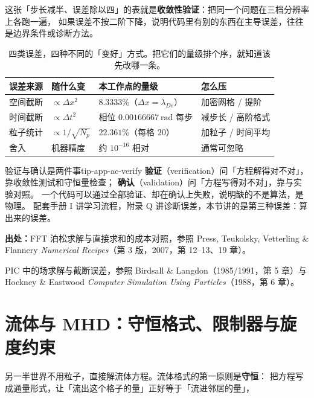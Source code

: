 这张「步长减半、误差除以四」的表就是\textbf{收敛性验证}：把同一个问题在三档分辨率上各跑一遍，
如果误差不按二阶下降，说明代码里有别的东西在主导误差，往往是边界条件或诊断方法。

\begin{table}[htbp]
\centering
\small
\caption{四类误差，四种不同的「变好」方式。把它们的量级排个序，就知道该先改哪一条。}
\label{tab:app-ac-error}
\begin{tabular}{p{3.0cm}p{3.2cm}p{3.4cm}p{3.2cm}}
\toprule
误差来源 & 随什么变 & 本工作点的量级 & 怎么压 \\
\midrule
空间截断 & $\propto\Delta x^2$ & $8.3333\%$（$\Delta x=\lambda_{De}$） & 加密网格 / 提阶 \\
时间截断 & $\propto\Delta t^2$ & 相位 $0.00166667\ \mathrm{rad}$ 每步 & 减步长 / 高阶格式 \\
粒子统计 & $\propto1/\sqrt{N_p}$ & $22.361\%$（每格 $20$） & 加粒子 / 时间平均 \\
舍入 & 机器精度 & 约 $10^{-16}$ 相对 & 通常可忽略 \\
\bottomrule
\end{tabular}

\end{table}

\begin{tip}{验证与确认是两件事}{tip-app-ac-verify}
\textbf{验证}（verification）问「方程解得对不对」，靠收敛性测试和守恒量检查；
\textbf{确认}（validation）问「方程写得对不对」，靠与实验对照。
一个代码可以通过全部验证、却在确认上失败，说明缺的不是算法，是物理。
配套手册 I 讲学习流程，附录 Q 讲诊断误差，本节讲的是第三种误差：算出来的误差。
\end{tip}

{\footnotesize
\textbf{出处：}FFT 泊松求解与直接求和的成本对照，参照 Press, Teukolsky, Vetterling \& Flannery
\emph{Numerical Recipes}（第 3 版，2007，第 12--13、19 章）。

PIC 中的场求解与截断误差，参照 Birdsall \& Langdon（1985/1991，第 5 章）与
Hockney \& Eastwood \emph{Computer Simulation Using Particles}（1988，第 6 章）。
}

\section{流体与 MHD：守恒格式、限制器与旋度约束}
\label{sec:app-ac-mhd}

另一半世界不用粒子，直接解流体方程。流体格式的第一原则是\textbf{守恒}：
把方程写成通量形式，让「流出这个格子的量」正好等于「流进邻居的量」，

